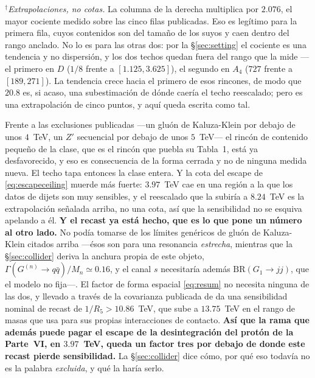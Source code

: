 \documentclass[11pt,a4paper]{article}
\begin{document}
\noindent$^{\dagger}$\emph{Extrapolaciones, no cotas.} La columna de la derecha multiplica por
$2.076$, el mayor cociente medido sobre las cinco filas publicadas. Eso es legítimo para la primera
fila, cuyos contenidos son del tamaño de los suyos y caen dentro del rango anclado. No lo es para
las otras dos: por la \S\ref{sec:setting} el cociente es una tendencia y no dispersión, y los dos
techos quedan fuera del rango que la mide ---el primero en $D$ ($1/8$ frente a $[1.125,3.625]$), el
segundo en $A_4$ ($727$ frente a $[189,271]$). La tendencia crece hacia el primero de esos rincones,
de modo que $20.8$ es, si acaso, una subestimación de dónde caería el techo reescalado; pero es una
extrapolación de
cinco puntos, y aquí queda escrita como tal.

\noindent Frente a las exclusiones publicadas ---un gluón de Kaluza-Klein por debajo de unos
$4$~TeV, un $Z'$ secuencial por debajo de unos $5$~TeV--- el rincón de contenido pequeño de la clase,
que es el rincón que puebla su Tabla~1, está ya desfavorecido, y eso es consecuencia de la forma
cerrada y no de ninguna medida nueva. El techo tapa entonces la clase entera. Y la cota del escape
de \eqref{eq:escapeceiling} muerde más fuerte: $3.97$~TeV cae en una región a la que los datos de
dijets son muy sensibles, y el reescalado que la subiría a $8.24$~TeV es la extrapolación señalada
arriba, no una cota, así que la sensibilidad no se esquiva apelando a él. \textbf{Y el recast ya
está hecho, que es lo que pone un número al otro lado.} No podía tomarse de los límites genéricos de
gluón de Kaluza-Klein citados arriba ---ésos son para una resonancia \emph{estrecha}, mientras que
la \S\ref{sec:collider} deriva la anchura propia de este objeto,
$\Gamma(G^{(n)}\!\to q\bar q)/M_n\simeq0.16$, y el canal $s$ necesitaría además
$\mathrm{BR}(G_1\to jj)$, que el modelo no fija---. El factor de forma espacial \eqref{eq:resum}
no necesita ninguna de las dos, y llevado a través de la covarianza publicada de
\cite{CMSangular} da una sensibilidad nominal de recast de $1/R_5>10.86$~TeV, que sube a
$13.75$~TeV en el rango de masas que \cite{CMSangular} usa para sus propias interacciones de
contacto. \textbf{Así que la rama que además puede pagar el escape de la desintegración del protón de
la Parte~VI, en $3.97$~TeV, queda un factor tres por debajo de donde este recast pierde
sensibilidad.} La \S\ref{sec:collider} dice cómo, por qué eso todavía no es la palabra
\emph{excluida}, y qué la haría serlo.
\end{document}
